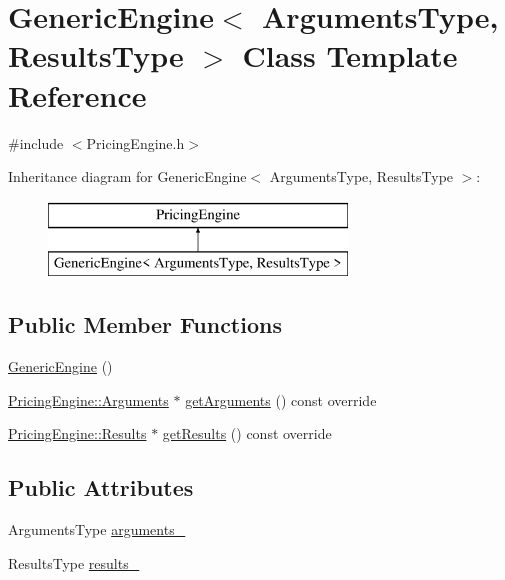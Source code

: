 \hypertarget{class_generic_engine}{}\section{Generic\+Engine$<$ Arguments\+Type, Results\+Type $>$ Class Template Reference}
\label{class_generic_engine}


{\ttfamily \#include $<$Pricing\+Engine.\+h$>$}

Inheritance diagram for Generic\+Engine$<$ Arguments\+Type, Results\+Type $>$\+:\begin{figure}[H]
\begin{center}
\leavevmode
\includegraphics[height=2.000000cm]{class_generic_engine}
\end{center}
\end{figure}
\subsection*{Public Member Functions}
\begin{DoxyCompactItemize}
\item 
\hyperlink{class_generic_engine_a080b4df876712b5529b4a19ec3b0c48f}{Generic\+Engine} ()
\item 
\hyperlink{class_pricing_engine_1_1_arguments}{Pricing\+Engine\+::\+Arguments} $\ast$ \hyperlink{class_generic_engine_ac2adcbbc8d7b554e2cc1f90e4c4d055d}{get\+Arguments} () const override
\item 
\hyperlink{class_pricing_engine_1_1_results}{Pricing\+Engine\+::\+Results} $\ast$ \hyperlink{class_generic_engine_a2b8d7fba7e51c0795ea9f1e9c2f54afd}{get\+Results} () const override
\end{DoxyCompactItemize}
\subsection*{Public Attributes}
\begin{DoxyCompactItemize}
\item 
Arguments\+Type \hyperlink{class_generic_engine_a9ac595191e5d6976c65659d26063bfc8}{arguments\+\_\+}
\item 
Results\+Type \hyperlink{class_generic_engine_acd6af7c4b3fd0e43826755ba7d347dd5}{results\+\_\+}
\end{DoxyCompactItemize}


